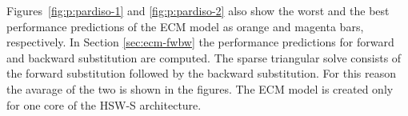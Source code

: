 
Figures~\ref{fig:p:pardiso-1} and \ref{fig:p:pardiso-2} also show the worst and the best performance predictions of the ECM model
as orange and magenta bars, respectively.
In Section \ref{sec:ecm-fwbw} the performance predictions for forward and backward substitution are computed. The sparse triangular solve consists of the forward substitution followed by the backward substitution. For this reason the avarage of the two is shown in the figures. The ECM model is created only for one core of the HSW-S architecture.
